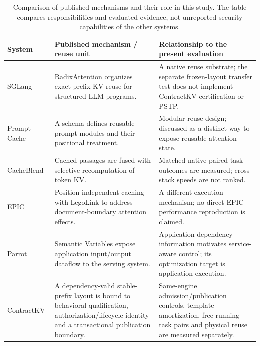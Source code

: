 \begin{table}[t]
\centering\small
\caption{Comparison of published mechanisms and their role in this study. The table compares responsibilities and evaluated evidence, not unreported security capabilities of the other systems.}
\label{tab:s-mechanisms}
\begin{tabular}{@{}lP{6.5cm}P{7.3cm}@{}}
\toprule
System & Published mechanism / reuse unit & Relationship to the present evaluation\\
\midrule
SGLang~\cite{sglang2024} & RadixAttention organizes exact-prefix KV reuse for structured LLM programs. & A native reuse substrate; the separate frozen-layout transfer test does not implement ContractKV certification or PSTP.\\
Prompt Cache~\cite{promptcache2024} & A schema defines reusable prompt modules and their positional treatment. & Modular reuse design; discussed as a distinct way to expose reusable attention state.\\
CacheBlend~\cite{cacheblend2025} & Cached passages are fused with selective recomputation of token KV. & Matched-native paired task outcomes are measured; cross-stack speeds are not ranked.\\
EPIC~\cite{epic2025} & Position-independent caching with LegoLink to address document-boundary attention effects. & A different execution mechanism; no direct EPIC performance reproduction is claimed.\\
Parrot~\cite{parrot2024} & Semantic Variables expose application input/output dataflow to the serving system. & Application dependency information motivates service-aware control; its optimization target is application execution.\\
ContractKV & A dependency-valid stable-prefix layout is bound to behavioral qualification, authorization/lifecycle identity and a transactional publication boundary. & Same-engine admission/publication controls, template amortization, free-running task pairs and physical reuse are measured separately.\\
\bottomrule
\end{tabular}
\end{table}

